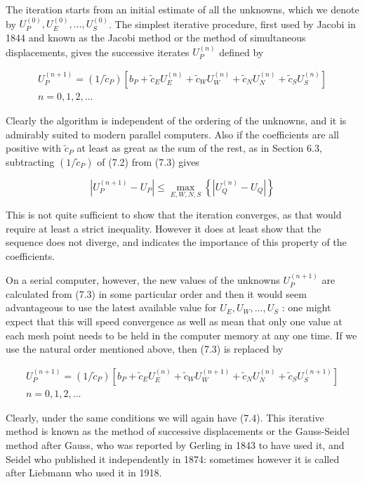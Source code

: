 \documentclass[10pt]{article}
\begin{document}
The iteration starts from an initial estimate of all the unknowns, which we denote by \(U_{P}^{(0)}, U_{E}^{(0)}, \ldots, U_{S}^{(0)}\). The simplest iterative procedure, first used by Jacobi in 1844 and known as the Jacobi method or the method of simultaneous displacements, gives the successive iterates \(U_{P}^{(n)}\) defined by

\[
\begin{array}{r}
U_{P}^{(n+1)}=\left(1 / \tilde{c}_{P}\right)\left[b_{P}+\tilde{c}_{E} U_{E}^{(n)}+\tilde{c}_{W} U_{W}^{(n)}+\tilde{c}_{N} U_{N}^{(n)}+\tilde{c}_{S} U_{S}^{(n)}\right] \\
n=0,1,2, \ldots
\end{array}
\]

Clearly the algorithm is independent of the ordering of the unknowns, and it is admirably suited to modern parallel computers. Also if the coefficients are all positive with \(\tilde{c}_{P}\) at least as great as the sum of the rest, as in Section 6.3, subtracting \(\left(1 / \tilde{c}_{P}\right)\) of (7.2) from (7.3) gives

\[
\left|U_{P}^{(n+1)}-U_{P}\right| \leq \max _{E, W, N, S}\left\{\left|U_{Q}^{(n)}-U_{Q}\right|\right\}
\]

This is not quite sufficient to show that the iteration converges, as that would require at least a strict inequality. However it does at least show that the sequence does not diverge, and indicates the importance of this property of the coefficients.

On a serial computer, however, the new values of the unknowns \(U_{P}^{(n+1)}\) are calculated from (7.3) in some particular order and then it would seem advantageous to use the latest available value for \(U_{E}, U_{W}, \ldots, U_{S}\) : one might expect that this will speed convergence as well as mean that only one value at each mesh point needs to be held in the computer memory at any one time. If we use the natural order mentioned above, then (7.3) is replaced by

\[
\begin{array}{r}
U_{P}^{(n+1)}=\left(1 / \tilde{c}_{P}\right)\left[b_{P}+\tilde{c}_{E} U_{E}^{(n)}+\tilde{c}_{W} U_{W}^{(n+1)}+\tilde{c}_{N} U_{N}^{(n)}+\tilde{c}_{S} U_{S}^{(n+1)}\right] \\
n=0,1,2, \ldots
\end{array}
\]

Clearly, under the same conditions we will again have (7.4). This iterative method is known as the method of successive displacements or the Gauss-Seidel method after Gauss, who was reported by Gerling in 1843 to have used it, and Seidel who published it independently in 1874: sometimes however it is called after Liebmann who used it in 1918.
\end{document}
